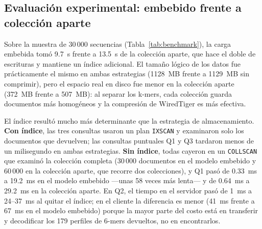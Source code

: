 \documentclass[pdflatex,sn-vancouver-num,lineno,referee]{sn-jnl}
\begin{document}
\subsection{Evaluación experimental: embebido frente a colección aparte}\label{sec:resultados-exp}

Sobre la muestra de 30\,000 secuencias (Tabla~\ref{tab:benchmark}), la carga
embebida tomó 9.7~s frente a 13.5~s de la colección aparte, que hace el doble
de escrituras y mantiene un índice adicional. El tamaño lógico de los datos
fue prácticamente el mismo en ambas estrategias (1128~MB frente a 1129~MB sin
comprimir), pero el espacio real en disco fue menor en la colección aparte
(372~MB frente a 507~MB): al separar los k-mers, cada colección guarda
documentos más homogéneos y la compresión de WiredTiger es más efectiva.

El índice resultó mucho más determinante que la estrategia de
almacenamiento. \textbf{Con índice}, las tres consultas usaron un plan
\texttt{IXSCAN} y examinaron solo los documentos que devuelven; las
consultas puntuales Q1 y Q3 tardaron menos de un milisegundo en ambas
estrategias. \textbf{Sin índice}, todas cayeron en un \texttt{COLLSCAN} que
examinó la colección completa (30\,000 documentos en el modelo embebido y
60\,000 en la colección aparte, que recorre dos colecciones), y Q1 pasó de
0.33~ms a 19.2~ms en el modelo embebido ---unas 58 veces más lenta--- y de
0.64~ms a 29.2~ms en la colección aparte. En Q2, el tiempo en el servidor
pasó de 1~ms a 24--37~ms al quitar el índice; en el cliente la diferencia es
menor (41~ms frente a 67~ms en el modelo embebido) porque la mayor parte del
costo está en transferir y decodificar los 179 perfiles de 6-mers devueltos,
no en encontrarlos.
\end{document}
